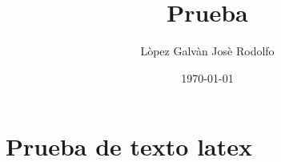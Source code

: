 \documentclass[letterpaper,12pt]{report}
\title{Prueba}
\author{Lòpez Galvàn Josè Rodolfo}
\date{\today}
\begin{document}
\maketitle
\tableofcontents

\begin{abstract}

\end{abstract}

\chapter{Prueba de texto latex}
\end{document}
